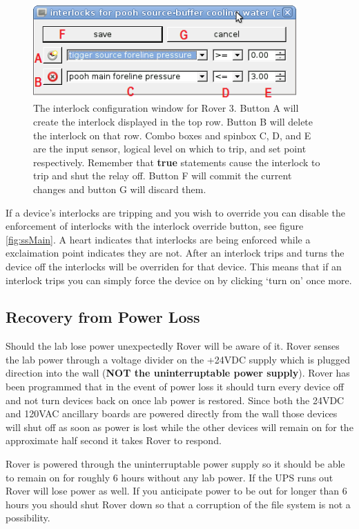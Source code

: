 \documentclass{article}
\begin{document}
\begin{figure}
\centering
\includegraphics[width=0.9\textwidth]{ssInter.png}
\caption{The interlock configuration window for Rover 3. Button A will create the interlock displayed in the top row. Button B will delete the interlock on that row. Combo boxes and spinbox C, D, and E are the input sensor, logical level on which to trip, and set point respectively. Remember that \textbf{true} statements cause the interlock to trip and shut the relay off. Button F will commit the current changes and button G will discard them.}
\label{fig:ssInter}
\end{figure}

If a device's interlocks are tripping and you wish to override you can disable the enforcement of interlocks with the interlock override button, see figure \ref{fig:ssMain}. A heart indicates that interlocks are being enforced while a exclaimation point indicates they are not. After an interlock trips and turns the device off the interlocks will be overriden for that device. This means that if an interlock trips you can simply force the device on by clicking `turn on' once more.

\subsection{Recovery from Power Loss}
Should the lab lose power unexpectedly Rover will be aware of it. Rover senses the lab power through a voltage divider on the +24VDC supply which is plugged direction into the wall (\textbf{NOT the uninterruptable power supply}). Rover has been programmed that in the event of power loss it should turn every device off and not turn devices back on once lab power is restored. Since both the 24VDC and 120VAC ancillary boards are powered directly from the wall those devices will shut off as soon as power is lost while the other devices will remain on for the approximate half second it takes Rover to respond. 

Rover is powered through the uninterruptable power supply so it should be able to remain on for roughly 6 hours without any lab power. If the UPS runs out Rover will lose power as well. If you anticipate power to be out for longer than 6 hours you should shut Rover down so that a corruption of the file system is not a possibility.
\end{document}
